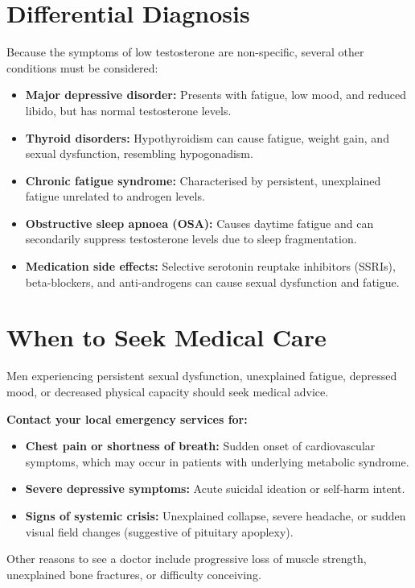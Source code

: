 \section*{Differential Diagnosis}
Because the symptoms of low testosterone are non-specific, several other conditions must be considered:
\begin{itemize}
    \item \textbf{Major depressive disorder:} Presents with fatigue, low mood, and reduced libido, but has normal testosterone levels.
    \item \textbf{Thyroid disorders:} Hypothyroidism can cause fatigue, weight gain, and sexual dysfunction, resembling hypogonadism.
    \item \textbf{Chronic fatigue syndrome:} Characterised by persistent, unexplained fatigue unrelated to androgen levels.
    \item \textbf{Obstructive sleep apnoea (OSA):} Causes daytime fatigue and can secondarily suppress testosterone levels due to sleep fragmentation.
    \item \textbf{Medication side effects:} Selective serotonin reuptake inhibitors (SSRIs), beta-blockers, and anti-androgens can cause sexual dysfunction and fatigue.
\end{itemize}

\section*{When to Seek Medical Care}
Men experiencing persistent sexual dysfunction, unexplained fatigue, depressed mood, or decreased physical capacity should seek medical advice.

\textbf{Contact your local emergency services for:}
\begin{itemize}
    \item \textbf{Chest pain or shortness of breath:} Sudden onset of cardiovascular symptoms, which may occur in patients with underlying metabolic syndrome.
    \item \textbf{Severe depressive symptoms:} Acute suicidal ideation or self-harm intent.
    \item \textbf{Signs of systemic crisis:} Unexplained collapse, severe headache, or sudden visual field changes (suggestive of pituitary apoplexy).
\end{itemize}
Other reasons to see a doctor include progressive loss of muscle strength, unexplained bone fractures, or difficulty conceiving.

